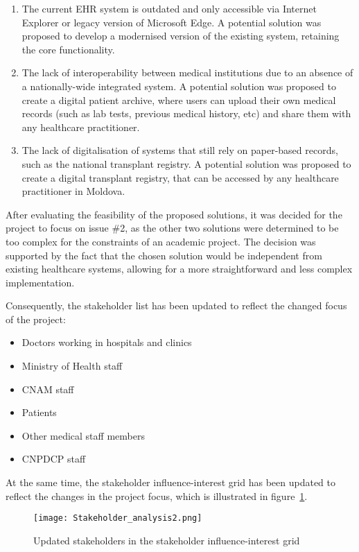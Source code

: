 \begin{enumerate}
    \item The current EHR system is outdated and only accessible via Internet Explorer or legacy version of Microsoft Edge. A potential solution was proposed to develop a modernised version of the existing system, retaining the core functionality. 
    \item The lack of interoperability between medical institutions due to an absence of a nationally-wide integrated system. A potential solution was proposed to create a digital patient archive, where users can upload their own medical records (such as lab tests, previous medical history, etc) and share them with any healthcare practitioner. 
    \item The lack of digitalisation of systems that still rely on paper-based records, such as the national transplant registry. A potential solution was proposed to create a digital transplant registry, that can be accessed by any healthcare practitioner in Moldova.
\end{enumerate}

After evaluating the feasibility of the proposed solutions, it was decided for the project to focus on issue \#2, as the other two solutions were determined to be too complex for the constraints of an academic project. The decision was supported by the fact that the chosen solution would be independent from existing healthcare systems, allowing for a more straightforward and less complex implementation. 

Consequently, the stakeholder list has been updated to reflect the changed focus of the project:
\begin{itemize}
    \item Doctors working in hospitals and clinics
    \item Ministry of Health staff
    \item CNAM staff
    \item Patients
    \item Other medical staff members
    \item CNPDCP staff
\end{itemize}

At the same time, the stakeholder influence-interest grid has been updated to reflect the changes in the project focus, which is illustrated in figure~\ref{fig:stakeholder_analysis2}.

\begin{figure}[ht]
    \centering
    \texttt{[image: Stakeholder\_analysis2.png]}
    \caption{Updated stakeholders in the stakeholder influence-interest grid}\label{fig:stakeholder_analysis2}
\end{figure}

